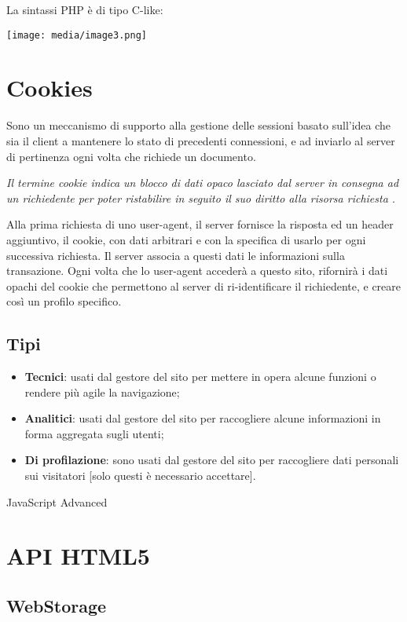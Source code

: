 La sintassi PHP è di tipo C-like:

\texttt{[image: media/image3.png]}

\section{Cookies}\label{cookies}

Sono un meccanismo di supporto alla gestione delle sessioni basato
sull'idea che sia il client a mantenere lo stato di precedenti
connessioni, e ad inviarlo al server di pertinenza ogni volta che
richiede un documento.

\emph{Il termine cookie indica un blocco di dati opaco lasciato dal
server in consegna ad un richiedente per poter ristabilire in seguito il
suo diritto alla risorsa richiesta .}

Alla prima richiesta di uno user-agent, il server fornisce la risposta
ed un header aggiuntivo, il cookie, con dati arbitrari e con la
specifica di usarlo per ogni successiva richiesta. Il server associa a
questi dati le informazioni sulla transazione. Ogni volta che lo
user-agent accederà a questo sito, rifornirà i dati opachi del cookie
che permettono al server di ri-identificare il richiedente, e creare
così un profilo specifico.

\subsection{Tipi}\label{tipi}

\begin{itemize}
\item
  \textbf{Tecnici}: usati dal gestore del sito per mettere in opera
  alcune funzioni o rendere più agile la navigazione;
\item
  \textbf{Analitici}: usati dal gestore del sito per raccogliere alcune
  informazioni in forma aggregata sugli utenti;
\item
  \textbf{Di profilazione}: sono usati dal gestore del sito per
  raccogliere dati personali sui visitatori {[}solo questi è necessario
  accettare{]}.
\end{itemize}

JavaScript Advanced

\section{API HTML5}\label{api-html5}

\subsection{WebStorage}\label{webstorage}

